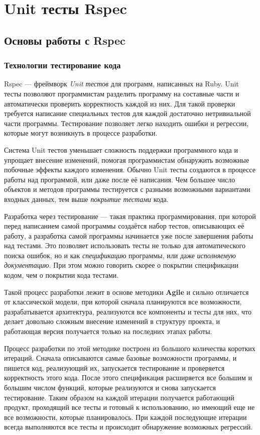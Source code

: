 \chapter{Unit тесты Rspec}

\section{Основы работы с Rspec}

\subsection{Технологии тестирование кода}

Rspec --- фреймворк \textit{Unit тестов} для программ, написанных на Ruby. Unit тесты позволяют программистам разделить программу на составные части и автоматически проверить корректность каждой из них. Для такой проверки требуется написание специальных тестов для каждой достаточно нетривиальной части программы. Тестирование позволяет легко находить ошибки и регрессии, которые могут возникнуть в процессе разработки.

Система Unit тестов уменьшает сложность поддержки программного кода и упрощает внесение изменений, помогая программистам обнаружить возможные побочные эффекты каждого изменения. Обычно Unit тесты создаются в процессе работы над программой, или даже после её написания. Чем большее число объектов и методов программы тестируется с разными возможными вариантами входных данных, тем выше \textit{покрытие тестами} кода.

Разработка через тестирование --- такая практика программирования, при которой перед написанием самой программы создаётся набор тестов, описывающих её работу, а разработка самой программы начинается уже после завершения работы над тестами. Это позволяет использовать тесты не только для автоматического поиска ошибок, но и как \textit{спецификацию} программы, или даже \textit{исполняемую документацию}. При этом можно говорить скорее о покрытии спецификации кодом, чем о покрытии кода тестами.

Такой процесс разработки лежит в основе методики \textbf{Agile} и сильно отличается от классической модели, при которой сначала планируются все возможности, разрабатывается архитектура, реализуются все компоненты и тесты для них, что делает довольно сложным внесение изменений в структуру проекта, и работающая версия получается только на последних этапах работы.

Процесс разработки по этой методике построен из большого количества коротких итераций. Сначала описываются самые базовые возможности программы, и пишется код, реализующий их, запускается тестирование и проверяется корректность этого кода. После этого спецификация расширяется все большим и большим числом функций, которые реализуются и снова запускается тестирование. Таким образом на каждой итерации получается работающий продукт, проходящий все тесты и готовый к использованию, но имеющий еще не все возможности, которые планировалось. При каждой последующие итерации всегда выполняются все тесты и происходит обнаружение возможных регрессий.

